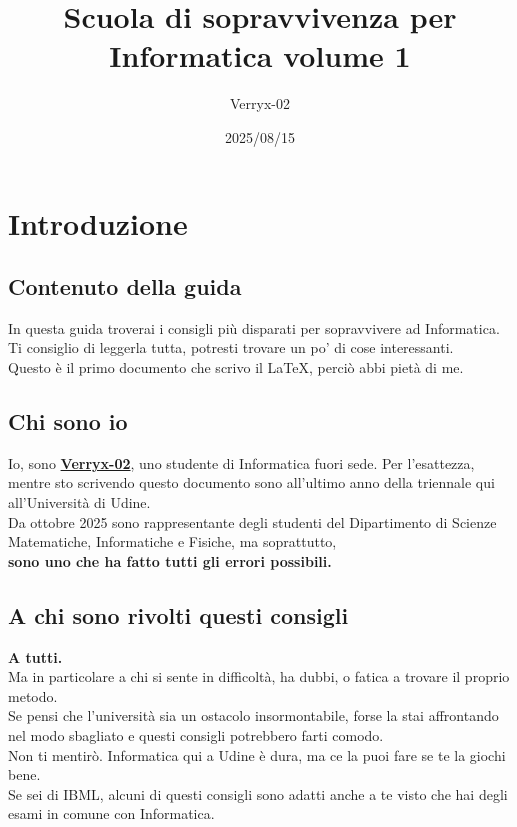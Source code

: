 \documentclass[18pt]{extarticle}
\title{Scuola di sopravvivenza per Informatica volume 1}
\author{Verryx-02}
\date{2025/08/15}
\begin{document}
\maketitle

\tableofcontents
\newpage

\section{Introduzione}

\subsection{Contenuto della guida}
In questa guida troverai i consigli più disparati per sopravvivere ad Informatica. Ti consiglio di leggerla tutta, potresti trovare un po' di cose interessanti.\\
Questo è il primo documento che scrivo il \LaTeX, perciò abbi pietà di me.

\subsection{Chi sono io}
Io, sono \href{https://github.com/Verryx-02}{\textbf{Verryx-02}}, uno studente di Informatica fuori sede. 
Per l'esattezza, mentre sto scrivendo questo documento sono all'ultimo anno della triennale qui all'Università di Udine.\\
Da ottobre 2025 sono rappresentante degli studenti del Dipartimento di Scienze Matematiche, Informatiche e Fisiche, ma soprattutto,\\
\textbf{sono uno che ha fatto tutti gli errori possibili.}


\subsection{A chi sono rivolti questi consigli}
\textbf{A tutti.}\\
Ma in particolare a chi si sente in difficoltà, ha dubbi, o fatica a trovare il proprio metodo.\\
Se pensi che l'università sia un ostacolo insormontabile, forse la stai affrontando nel modo sbagliato e questi consigli potrebbero farti comodo.\\
Non ti mentirò. Informatica qui a Udine è dura, ma ce la puoi fare se te la giochi bene.\\
Se sei di IBML, alcuni di questi consigli sono adatti anche a te visto che hai degli esami in comune con Informatica. 
\end{document}

